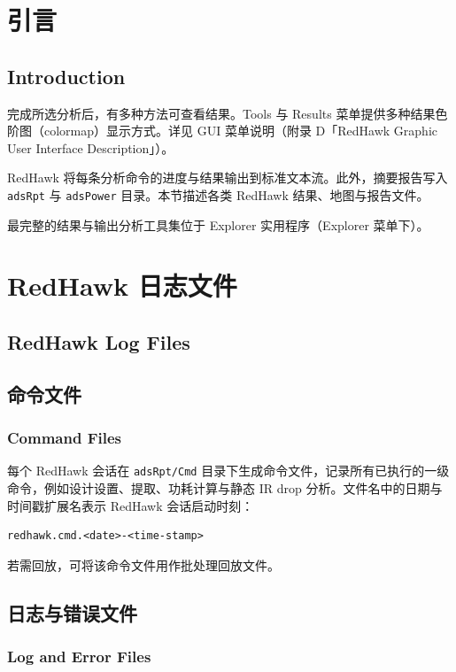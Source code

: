 ﻿%
\label{chap:reports}

\section{引言}
\subsection*{Introduction}

完成所选分析后，有多种方法可查看结果。Tools 与 Results 菜单提供多种结果色阶图（colormap）显示方式。详见 GUI 菜单说明（附录 D「RedHawk Graphic User Interface Description」）。

RedHawk 将每条分析命令的进度与结果输出到标准文本流。此外，摘要报告写入 \texttt{adsRpt} 与 \texttt{adsPower} 目录。本节描述各类 RedHawk 结果、地图与报告文件。

最完整的结果与输出分析工具集位于 Explorer 实用程序（Explorer 菜单下）。

\section{RedHawk 日志文件}
\subsection*{RedHawk Log Files}

\subsection{命令文件}
\subsubsection*{Command Files}

每个 RedHawk 会话在 \texttt{adsRpt/Cmd} 目录下生成命令文件，记录所有已执行的一级命令，例如设计设置、提取、功耗计算与静态 IR drop 分析。文件名中的日期与时间戳扩展名表示 RedHawk 会话启动时刻：
\begin{lstlisting}
redhawk.cmd.<date>-<time-stamp>
\end{lstlisting}
若需回放，可将该命令文件用作批处理回放文件。

\subsection{日志与错误文件}
\subsubsection*{Log and Error Files}

